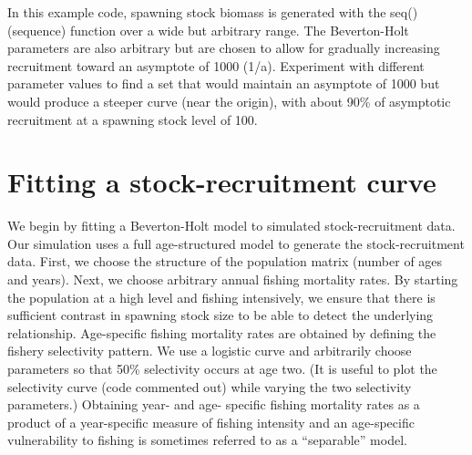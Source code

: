 \documentclass[
]{krantz}
\begin{document}
In this example code, spawning stock biomass is generated with the seq() (sequence) function over a wide but arbitrary range. The Beverton-Holt parameters are also arbitrary but are chosen to allow for gradually increasing recruitment toward an asymptote of 1000 (1/a). Experiment with different parameter values to find a set that would maintain an asymptote of 1000 but would produce a steeper curve (near the origin), with about 90\% of asymptotic recruitment at a spawning stock level of 100.

\hypertarget{Recruit-Fit}{%
\section{Fitting a stock-recruitment curve}\label{Recruit-Fit}}

We begin by fitting a Beverton-Holt model to simulated stock-recruitment data. Our simulation uses a full age-structured model to generate the stock-recruitment data. First, we choose the structure of the population matrix (number of ages and years). Next, we choose arbitrary annual fishing mortality rates. By starting the population at a high level and fishing intensively, we ensure that there is sufficient contrast \citep{hilborn.walters_1992} in spawning stock size to be able to detect the underlying relationship. Age-specific fishing mortality rates are obtained by defining the fishery selectivity pattern. We use a logistic curve and arbitrarily choose parameters so that 50\% selectivity occurs at age two. (It is useful to plot the selectivity curve (code commented out) while varying the two selectivity parameters.) Obtaining year- and age- specific fishing mortality rates as a product of a year-specific measure of fishing intensity and an age-specific vulnerability to fishing is sometimes referred to as a ``separable'' model.
\end{document}
